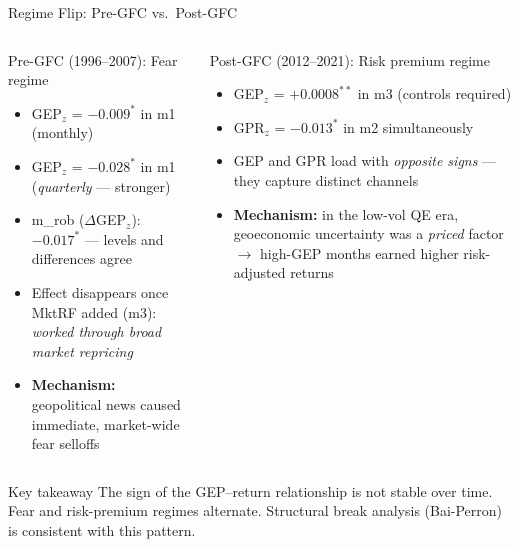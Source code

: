 \documentclass[aspectratio=169]{beamer}
\begin{document}
\begin{frame}{Regime Flip: Pre-GFC vs.\ Post-GFC}

\begin{columns}[T]
\begin{block}{\textcolor{AccentOrange}{Pre-GFC (1996--2007): Fear regime}}
\begin{itemize}\small
  \item GEP$_z$ = $-0.009^*$ in m1 (monthly)
  \item GEP$_z$ = $-0.028^*$ in m1 (\emph{quarterly} — stronger)
  \item m\_rob ($\Delta$GEP$_z$): $-0.017^*$ — levels and differences agree
  \item Effect disappears once MktRF added (m3):
        \emph{worked through broad market repricing}
  \item \textbf{Mechanism:} geopolitical news caused immediate, market-wide fear selloffs
\end{itemize}
\end{block}

\begin{block}{\textcolor{AccentGreen}{Post-GFC (2012--2021): Risk premium regime}}
\begin{itemize}\small
  \item GEP$_z$ = $+0.0008^{**}$ in m3 (controls required)
  \item GPR$_z$ = $-0.013^*$ in m2 simultaneously
  \item GEP and GPR load with \emph{opposite signs} — they capture distinct channels
  \item \textbf{Mechanism:} in the low-vol QE era, geoeconomic uncertainty was a \emph{priced} factor
        $\to$ high-GEP months earned higher risk-adjusted returns
\end{itemize}
\end{block}
\end{columns}

\bigskip
\begin{alertblock}{Key takeaway}
  The sign of the GEP--return relationship is not stable over time.
  Fear and risk-premium regimes alternate. Structural break analysis
  (Bai-Perron) is consistent with this pattern.
\end{alertblock}

\end{frame}
\end{document}
